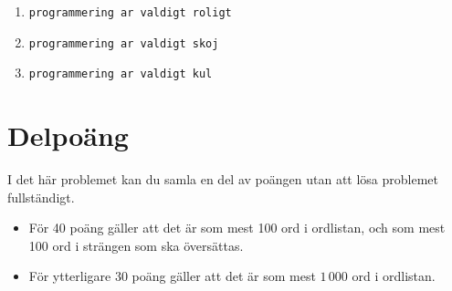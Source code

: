\begin{enumerate}
    \item \texttt{programmering ar valdigt roligt}
    \item \texttt{programmering ar valdigt skoj}
    \item \texttt{programmering ar valdigt kul}
\end{enumerate}

\section*{Delpoäng}
I det här problemet kan du samla en del av poängen utan att lösa problemet fullständigt.

\begin{itemize}
    \item För 40 poäng gäller att det är som mest 100 ord i ordlistan, och som mest 100 ord i strängen som ska översättas.
    \item För ytterligare 30 poäng gäller att det är som mest $1\,000$ ord i ordlistan.
\end{itemize}
